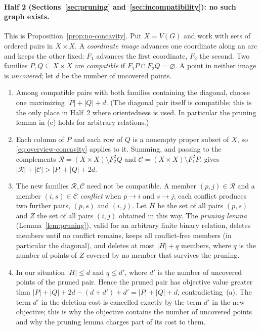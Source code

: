 \documentclass[11pt]{article}
\theoremstyle{remark}
\newcommand{\abs}[1]{\lvert #1\rvert}
\newcommand{\cR}{\mathcal R}
\newcommand{\cC}{\mathcal C}
\begin{document}
\paragraph{Half 2 (Sections~\ref{sec:pruning}
and~\ref{sec:incompatibility}): no such graph exists.}
This is Proposition~\ref{prop:no-concavity}. Put $X=V(G)$ and work with sets
of ordered pairs in $X\times X$. A \emph{coordinate image} advances one
coordinate along an arc and keeps the other fixed: $F_1$ advances the first
coordinate, $F_2$ the second. Two families $P,Q\subseteq X\times X$ are
\emph{compatible} if $F_1P\cap F_2Q=\varnothing$. A point in neither image is
\emph{uncovered}; let $d$ be the number of uncovered points.
\begin{enumerate}[label=(\alph*),leftmargin=2em]
\item Among compatible pairs with both families containing the diagonal,
choose one maximizing $\abs P+\abs Q+d$. (The diagonal pair itself is
compatible; this is the only place in Half~2 where orientedness is used.
In particular the pruning lemma in (c) holds for arbitrary relations.)
\item Each column of $P$ and each row of $Q$ is a nonempty proper subset of
$X$, so \eqref{eq:overview-concavity} applies to it. Summing, and passing
to the complements $\cR=(X\times X)\setminus F_2^2Q$ and
$\cC=(X\times X)\setminus F_1^2P$, gives
$\abs{\cR}+\abs{\cC}>\abs P+\abs Q+2d$.
\item The new families $\cR,\cC$ need not be compatible. A member
$(p,j)\in\cR$ and a member $(i,s)\in\cC$ \emph{conflict} when $p\to i$ and
$s\to j$; each conflict produces two further pairs, $(p,s)$ and $(i,j)$. Let
$H$ be the set of all pairs $(p,s)$ and $Z$ the set of all pairs $(i,j)$
obtained in this way. The \emph{pruning lemma} (Lemma~\ref{lem:pruning}),
valid for an arbitrary finite binary relation, deletes members until no
conflict remains, keeps all conflict-free members (in particular the
diagonal), and deletes at most $\abs H+q$ members, where $q$ is the number
of points of $Z$ covered by no member that survives the pruning.
\item In our situation $\abs H\le d$ and $q\le d'$, where $d'$ is the number
of uncovered points of the pruned pair. Hence the pruned pair has objective
value greater than
$\abs P+\abs Q+2d-(d+d')+d'=\abs P+\abs Q+d$, contradicting~(a). The
term $d'$ in the deletion cost is cancelled exactly by the term $d'$ in the
new objective; this is why the objective contains the number of uncovered
points and why the pruning lemma charges part of its cost to them.
\end{enumerate}
\end{document}
